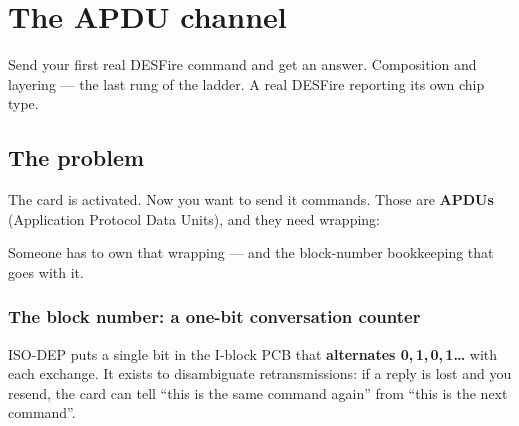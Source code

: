 \chapter{The APDU channel}
\label{ch:apdu}

\chapterbrief
  {Send your first real DESFire command and get an answer.}
  {Composition and layering --- the last rung of the ladder.}
  {A real DESFire reporting its own chip type.}

\section{The problem}

The card is activated. Now you want to send it commands. Those are
\textbf{APDUs} (Application Protocol Data Units), and they need wrapping:

\begin{center}
\end{center}

Someone has to own that wrapping --- and the block-number bookkeeping that goes
with it.

\subsection{The block number: a one-bit conversation counter}

ISO-DEP puts a single bit in the I-block PCB that \textbf{alternates
0,\,1,\,0,\,1\ldots} with each exchange. It exists to disambiguate
retransmissions: if a reply is lost and you resend, the card can tell ``this is
the same command again'' from ``this is the next command''.

